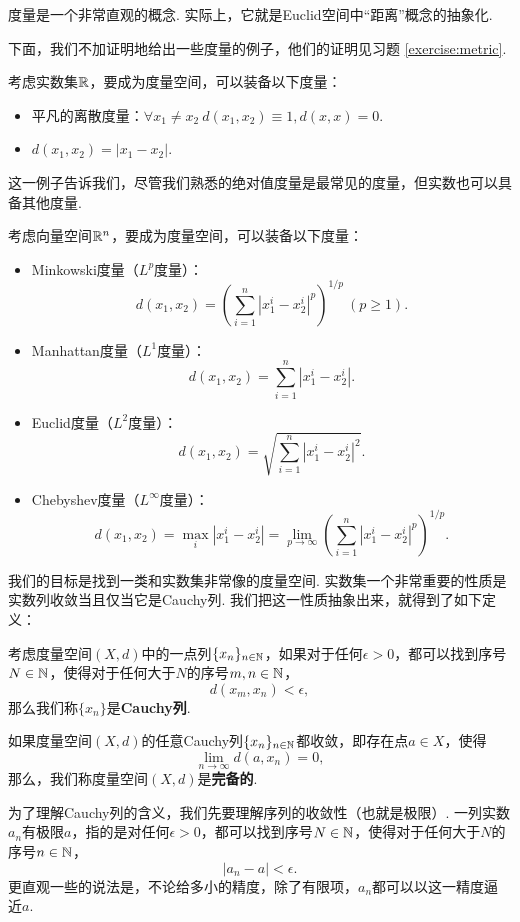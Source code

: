 度量是一个非常直观的概念. 实际上，它就是Euclid空间中“距离”概念的抽象化. 

下面，我们不加证明地给出一些度量的例子，他们的证明见习题 \ref{exercise:metric}.
\begin{example}\label{example:metric-main}
    考虑实数集$\mathbb{R}$，要成为度量空间，可以装备以下度量：
    \begin{itemize}
            \item 平凡的离散度量：$\forall x_1\neq x_2\ d(x_1,x_2)\equiv 1, d(x,x)=0$. 
            \item $d(x_1,x_2)=|x_1-x_2|$. 
        \end{itemize}
        这一例子告诉我们，尽管我们熟悉的绝对值度量是最常见的度量，但实数也可以具备其他度量.

        考虑向量空间$\mathbb{R}^n$，要成为度量空间，可以装备以下度量：
        \begin{itemize}
            \item Minkowski度量（$L^p$度量）：
            \[d(x_1,x_2)=\left(\sum_{i=1}^n|x_1^i-x_2^i|^p\right)^{1/p}\ (p\geq 1).\] 
            \item Manhattan度量（$L^1$度量）：
            \[d(x_1,x_2)=\sum_{i=1}^n|x_1^i-x_2^i|.\]
            \item Euclid度量（$L^2$度量）：
            \[d(x_1,x_2)=\sqrt{\sum_{i=1}^n|x_1^i-x_2^i|^2}.\]
            \item Chebyshev度量（$L^\infty$度量）：
            \[d(x_1,x_2)=\max_i|x_1^i-x_2^i|=\lim_{p\to\infty}\left(\sum_{i=1}^n|x_1^i-x_2^i|^p\right)^{1/p}.\]
        \end{itemize}
\end{example}

我们的目标是找到一类和实数集非常像的度量空间. 实数集一个非常重要的性质是实数列收敛当且仅当它是Cauchy列. 我们把这一性质抽象出来，就得到了如下定义：

\begin{definition}
    考虑度量空间$(X,d)$中的一点列$\{x_n\}_{n\in \mathbb{N}}$，如果对于任何$\epsilon>0$，都可以找到序号$N\in\mathbb{N}$，使得对于任何大于$N$的序号$m,n\in\mathbb{N}$，
    \[d(x_m,x_n)<\epsilon,\]
    那么我们称$\{x_n\}$是\textbf{Cauchy列}.

    如果度量空间$(X,d)$的任意Cauchy列$\{x_n\}_{n\in \mathbb{N}}$都收敛，即存在点$a\in X$，使得
    \[\lim_{n\to\infty}d(a,x_n)=0,\]
    那么，我们称度量空间$(X,d)$是\textbf{完备的}. 
\end{definition}

为了理解Cauchy列的含义，我们先要理解序列的收敛性（也就是极限）. 一列实数$a_n$有极限$a$，指的是对任何$\epsilon>0$，都可以找到序号$N\in\mathbb{N}$，使得对于任何大于$N$的序号$n\in\mathbb{N}$，
\[
    |a_n-a|<\epsilon.
\]
更直观一些的说法是，不论给多小的精度，除了有限项，$a_n$都可以以这一精度逼近$a$. 

